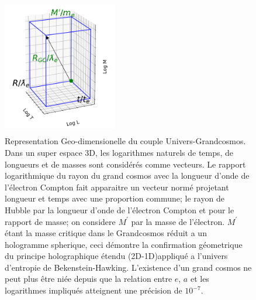 \documentclass[a4paper,12pt]{article}
\begin{document}
\begin{appendix}
\begin{figure}
\centering
\includegraphics[width=5cm,height=6cm]{./figures/triaxis.png} 
\caption[Representation Geo-dimensionelle du couple Univers-Grandcosmos]{Representation Geo-dimensionelle du couple Univers-Grandcosmos. Dans un super espace 3D, les logarithmes naturels de temps, de longueurs et de masses sont considérés comme vecteurs. Le rapport logarithmique du rayon du grand cosmos avec la longueur d'onde de l'électron Compton fait apparaitre un vecteur normé projetant longueur et temps avec une proportion commune; le rayon de Hubble par la longueur d'onde de l'électron Compton et pour le rapport de masse; on considere $M^{\prime}$ par la masse de l'électron. $M^{\prime}$ étant la masse critique dans le Grandcosmos réduit a un hologramme spherique, ceci démontre la confirmation géometrique du principe holographique étendu (2D-1D)appliqué a l'univers d'entropie de Bekenstein-Hawking. L'existence d'un grand cosmos ne peut plus \^etre niée depuis que la relation entre $e$, $a$ et les logarithmes impliqués atteignent une précision de $10^{-7}$.}
\label{fig:1:figure1}
\end{figure}



\end{appendix}
\end{document}
